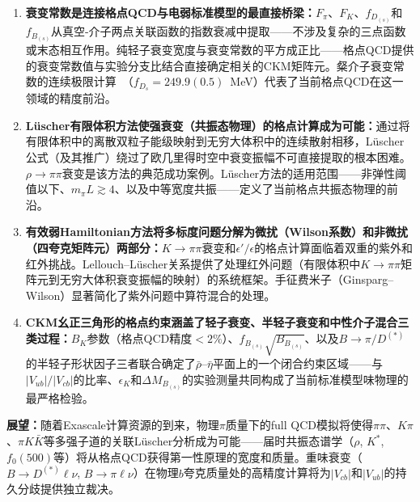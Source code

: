 \documentclass[12pt,a4paper]{ctexart}
\theoremstyle{definition}
\begin{document}
\begin{enumerate}[leftmargin=*]
    \item \textbf{衰变常数是连接格点QCD与电弱标准模型的最直接桥梁：}$F_\pi$、$F_K$、$f_{D_{(s)}}$和$f_{B_{(s)}}$从真空-介子两点关联函数的指数衰减中提取——不涉及复杂的三点函数或末态相互作用。纯轻子衰变宽度与衰变常数的平方成正比——格点QCD提供的衰变常数值与实验分支比结合直接确定相关的CKM矩阵元。粲介子衰变常数的连续极限计算~\cite{CharmedClover}（$f_{D_s}=249.9(0.5)$~MeV）代表了当前格点QCD在这一领域的精度前沿。

    \item \textbf{L\"uscher有限体积方法使强衰变（共振态物理）的格点计算成为可能：}通过将有限体积中的离散双粒子能级映射到无穷大体积中的连续散射相移，L\"uscher公式（及其推广）绕过了欧几里得时空中衰变振幅不可直接提取的根本困难。$\rho\to\pi\pi$衰变是该方法的典范成功案例。L\"uscher方法的适用范围——非弹性阈值以下、$m_\pi L \gtrsim 4$、以及中等宽度共振——定义了当前格点共振态物理的前沿。

    \item \textbf{有效弱Hamiltonian方法将多标度问题分解为微扰（Wilson系数）和非微扰（四夸克矩阵元）两部分：}$K\to\pi\pi$衰变和$\epsilon'/\epsilon$的格点计算面临着双重的紫外和红外挑战。Lellouch--L\"uscher关系提供了处理红外问题（有限体积中$K\to\pi\pi$矩阵元到无穷大体积衰变振幅的映射）的系统框架。手征费米子（Ginsparg--Wilson）显著简化了紫外问题中算符混合的处理。

    \item \textbf{CKM幺正三角形的格点约束涵盖了轻子衰变、半轻子衰变和中性介子混合三类过程：}$B_K$参数（格点QCD精度$<2\%$）、$f_{B_{(s)}}\sqrt{B_{B_{(s)}}}$、以及$B\to\pi/D^{(*)}$的半轻子形状因子三者联合确定了$\bar\rho\text{--}\bar\eta$平面上的一个闭合约束区域——与$|V_{ub}|/|V_{cb}|$的比率、$\epsilon_K$和$\Delta M_{B_{(s)}}$的实验测量共同构成了当前标准模型味物理的最严格检验。
\end{enumerate}

\textbf{展望：}随着Exascale计算资源的到来，物理$\pi$质量下的full QCD模拟将使得$\pi\pi$、$K\pi$、$\pi K\bar K$等多强子道的关联L\"uscher分析成为可能——届时共振态谱学（$\rho$, $K^*$, $f_0(500)$等）将从格点QCD获得第一性原理的宽度和质量。重味衰变（$B\to D^{(*)}\ell\nu$, $B\to\pi\ell\nu$）在物理$b$夸克质量处的高精度计算将为$|V_{cb}|$和$|V_{ub}|$的持久分歧提供独立裁决。
\end{document}

